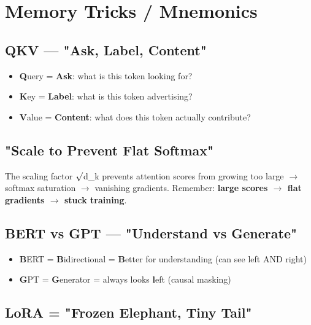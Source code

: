 \documentclass[11pt]{article}
\providecommand{\tightlist}{\setlength{\itemsep}{1pt}\setlength{\parskip}{0pt}}
\begin{document}
\section{Memory Tricks / Mnemonics}\label{memory-tricks--mnemonics}

\subsection{QKV --- "Ask, Label, Content"}\label{qkv--ask-label-content}

\begin{itemize}
\tightlist
\item
  \textbf{Q}uery = \textbf{Ask}: what is this token looking for?
\item
  \textbf{K}ey = \textbf{Label}: what is this token advertising?
\item
  \textbf{V}alue = \textbf{Content}: what does this token actually contribute?
\end{itemize}

\subsection{"Scale to Prevent Flat Softmax"}\label{scale-to-prevent-flat-softmax}

The scaling factor \(\surd\)d\_k prevents attention scores from growing too large \(\rightarrow\) softmax saturation \(\rightarrow\) vanishing gradients. Remember: \textbf{large scores \(\rightarrow\) flat gradients \(\rightarrow\) stuck training}.

\subsection{BERT vs GPT --- "Understand vs Generate"}\label{bert-vs-gpt--understand-vs-generate}

\begin{itemize}
\tightlist
\item
  \textbf{B}ERT = \textbf{B}idirectional = \textbf{B}etter for understanding (can see left AND right)
\item
  \textbf{G}PT = \textbf{G}enerator = always looks \textbf{l}eft (causal masking)
\end{itemize}

\subsection{LoRA = "Frozen Elephant, Tiny Tail"}\label{lora--frozen-elephant-tiny-tail}
\end{document}
